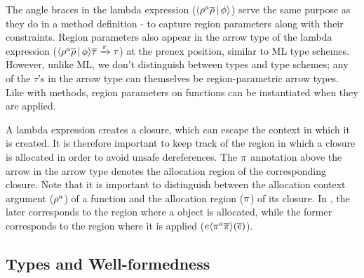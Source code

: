 The angle braces in the lambda expression ($\langle \rho^a\overline{\rho} \,|\,
\phi \rangle$) serve the same purpose as they do in a method definition - to
capture region parameters along with their constraints. Region
parameters also appear in the arrow type of the lambda expression 
($\langle \rho^a\overline{\rho} \,|\, \phi \rangle\overline{\tau} \xrightarrow{\pi}
\tau$) at the prenex position, similar to ML type schemes. However,
unlike ML, we don't distinguish between types and type schemes; any of
the $\tau$'s in the arrow type can themselves be region-parametric
arrow types. Like with methods, region parameters on functions can be
instantiated when they are applied.

A lambda expression creates a closure, which can escape the
context in which it is created. It is therefore important to keep track of
the region in which a closure is allocated in order to avoid unsafe
dereferences. The $\pi$ annotation above the arrow in the arrow
type denotes the allocation region of the corresponding closure. Note
that it is important to distinguish between the allocation context
argument ($\rho^a$) of a function and the allocation region
($\pi$) of its closure. In \name, the later corresponds to the region where
a  object is allocated, while the former corresponds to the
region where it is applied ($e\langle \pi^a\overline{\pi} \rangle(\overline{e})$). 


\subsection{Types and Well-formedness}

